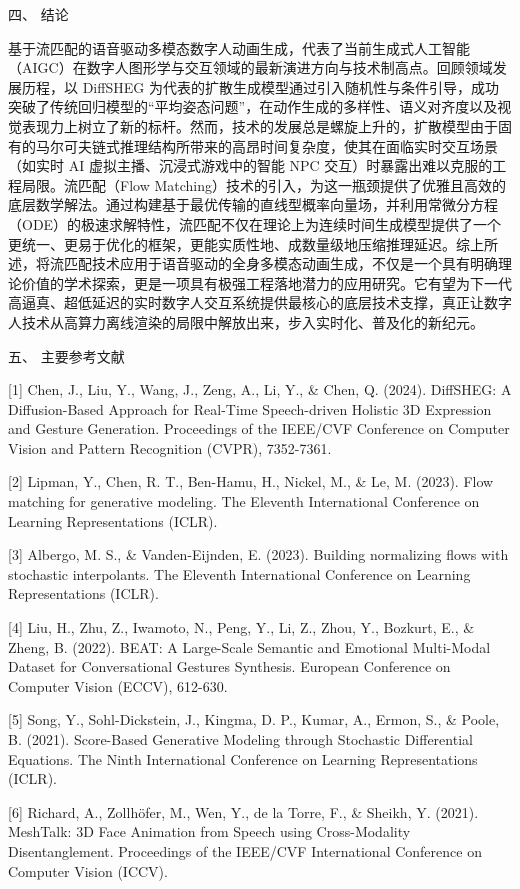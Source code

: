 \documentclass[UTF8]{ctexart}
\begin{document}
四、 结论

基于流匹配的语音驱动多模态数字人动画生成，代表了当前生成式人工智能（AIGC）在数字人图形学与交互领域的最新演进方向与技术制高点。回顾领域发展历程，以 DiffSHEG 为代表的扩散生成模型通过引入随机性与条件引导，成功突破了传统回归模型的``平均姿态问题''，在动作生成的多样性、语义对齐度以及视觉表现力上树立了新的标杆。然而，技术的发展总是螺旋上升的，扩散模型由于固有的马尔可夫链式推理结构所带来的高昂时间复杂度，使其在面临实时交互场景（如实时 AI 虚拟主播、沉浸式游戏中的智能 NPC 交互）时暴露出难以克服的工程局限。流匹配（Flow Matching）技术的引入，为这一瓶颈提供了优雅且高效的底层数学解法。通过构建基于最优传输的直线型概率向量场，并利用常微分方程（ODE）的极速求解特性，流匹配不仅在理论上为连续时间生成模型提供了一个更统一、更易于优化的框架，更能实质性地、成数量级地压缩推理延迟。综上所述，将流匹配技术应用于语音驱动的全身多模态动画生成，不仅是一个具有明确理论价值的学术探索，更是一项具有极强工程落地潜力的应用研究。它有望为下一代高逼真、超低延迟的实时数字人交互系统提供最核心的底层技术支撑，真正让数字人技术从高算力离线渲染的局限中解放出来，步入实时化、普及化的新纪元。

五、 主要参考文献

{[}1{]} Chen, J., Liu, Y., Wang, J., Zeng, A., Li, Y., \& Chen, Q.
(2024). DiffSHEG: A Diffusion-Based Approach for Real-Time Speech-driven
Holistic 3D Expression and Gesture Generation. Proceedings of the
IEEE/CVF Conference on Computer Vision and Pattern Recognition (CVPR),
7352-7361.

{[}2{]} Lipman, Y., Chen, R. T., Ben-Hamu, H., Nickel, M., \& Le, M.
(2023). Flow matching for generative modeling. The Eleventh
International Conference on Learning Representations (ICLR).

{[}3{]} Albergo, M. S., \& Vanden-Eijnden, E. (2023). Building
normalizing flows with stochastic interpolants. The Eleventh
International Conference on Learning Representations (ICLR).

{[}4{]} Liu, H., Zhu, Z., Iwamoto, N., Peng, Y., Li, Z., Zhou, Y.,
Bozkurt, E., \& Zheng, B. (2022). BEAT: A Large-Scale Semantic and
Emotional Multi-Modal Dataset for Conversational Gestures Synthesis.
European Conference on Computer Vision (ECCV), 612-630.

{[}5{]} Song, Y., Sohl-Dickstein, J., Kingma, D. P., Kumar, A., Ermon,
S., \& Poole, B. (2021). Score-Based Generative Modeling through
Stochastic Differential Equations. The Ninth International Conference on
Learning Representations (ICLR).

{[}6{]} Richard, A., Zollhöfer, M., Wen, Y., de la Torre, F., \& Sheikh,
Y. (2021). MeshTalk: 3D Face Animation from Speech using Cross-Modality
Disentanglement. Proceedings of the IEEE/CVF International Conference on
Computer Vision (ICCV).
\end{document}
